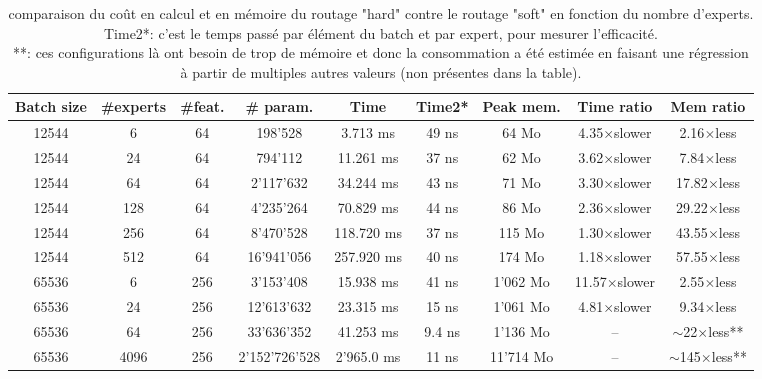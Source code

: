 \documentclass{article}
\begin{document}
\begin{table}[t]
\centering
\setlength{\tabcolsep}{4pt}
\renewcommand{\arraystretch}{1.15}
\begin{tabular*}{\textwidth}{@{\extracolsep{\fill}} | c | c c | c | c c | c | c c |}
\hline
\textbf{Batch size} & \textbf{\#experts} & \textbf{\#feat.} &
\textbf{\# param.} & \textbf{Time}& \textbf{Time2*} &
\textbf{Peak mem.} & \textbf{Time ratio} & \textbf{Mem ratio} \\
\hline
12544 & 6   & 64  &   198'528 &   3.713 ms  & 49 ns &   64 Mo  & 4.35$\times$slower & 2.16$\times$less \\
12544 & 24  & 64  &   794'112 &  11.261 ms  & 37 ns &   62 Mo  & 3.62$\times$slower & 7.84$\times$less \\
12544 & 64  & 64  & 2'117'632 &  34.244 ms  & 43 ns &   71 Mo  & 3.30$\times$slower & 17.82$\times$less \\
12544 & 128 & 64  & 4'235'264 &  70.829 ms  & 44 ns &   86 Mo  & 2.36$\times$slower & 29.22$\times$less \\
12544 & 256 & 64  & 8'470'528 & 118.720 ms  & 37 ns &  115 Mo  & 1.30$\times$slower & 43.55$\times$less \\
12544 & 512 & 64  &16'941'056 & 257.920 ms  & 40 ns &  174 Mo  & 1.18$\times$slower & 57.55$\times$less \\
\hline
65536 & 6    & 256 &   3'153'408  &   15.938 ms & 41 ns  &  1'062 Mo & 11.57$\times$slower & 2.55$\times$less \\
65536 & 24   & 256 &  12'613'632  &   23.315 ms & 15 ns  &  1'061 Mo & 4.81$\times$slower  & 9.34$\times$less \\
65536 & 64   & 256 &  33'636'352  &   41.253 ms & 9.4 ns &  1'136 Mo & --                  & $\sim$22$\times$less** \\
65536 & 4096 & 256 &2'152'726'528 &  2'965.0 ms & 11 ns  & 11'714 Mo & --                  & $\sim$145$\times$less** \\
\hline
\end{tabular*}
\caption{comparaison du coût en calcul et en mémoire du routage "hard" contre le routage "soft" en fonction du nombre d'experts.\\
Time2*: c'est le temps passé par élément du batch et par expert, pour mesurer l'efficacité.\\
**: ces configurations là ont besoin de trop de mémoire et donc la consommation a été estimée en faisant une régression à partir de multiples autres valeurs (non présentes dans la table).}
\label{tab:scaling_nb_experts}
\end{table}
\end{document}
